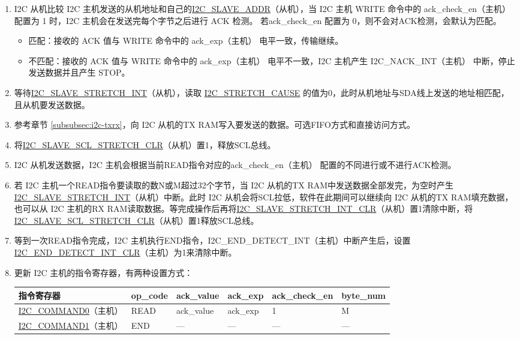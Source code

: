 \documentclass[main\_\_CN.tex]{subfiles}
\begin{document}
\begin{enumerate}
\item I2C 从机比较 I2C 主机发送的从机地址和自己的\hyperref[fielddesc:I2CSLAVEADDR]{I2C\_SLAVE\_ADDR}（从机），当 I2C 主机 WRITE 命令中的 ack\_check\_en（主机） 配置为 1 时，I2C 主机会在发送完每个字节之后进行 ACK 检测。 若ack\_check\_en 配置为 0，则不会对ACK检测，会默认为匹配。
\begin{itemize}
\item 匹配：接收的 ACK 值与 WRITE 命令中的 ack\_exp（主机） 电平一致，传输继续。
\item 不匹配：接收的 ACK 值与 WRITE 命令中的 ack\_exp（主机） 电平不一致，I2C 主机产生 I2C\_NACK\_INT（主机） 中断，停止发送数据并且产生 STOP。
\end{itemize}

\item 等待\hyperref[int:i2c-slave-stretch]{I2C\_SLAVE\_STRETCH\_INT}（从机），读取 \hyperref[fielddesc:I2CSTRETCHCAUSE]{I2C\_STRETCH\_CAUSE} 的值为0，此时从机地址与SDA线上发送的地址相匹配，且从机要发送数据。

\item 参考章节 \ref{subsubsec:i2c-txrx}，向 I2C 从机的TX RAM写入要发送的数据。可选FIFO方式和直接访问方式。
\item 将\hyperref[fielddesc:I2CSLAVESCLSTRETCHCLR]{I2C\_SLAVE\_SCL\_STRETCH\_CLR}（从机）置1，释放SCL总线。

\item I2C 从机发送数据，I2C 主机会根据当前READ指令对应的ack\_check\_en（主机） 配置的不同进行或不进行ACK检测。
\item 若 I2C 主机一个READ指令要读取的数N或M超过32个字节，当 I2C 从机的TX RAM中发送数据全部发完，为空时产生\hyperref[int:i2c-slave-stretch]{I2C\_SLAVE\_STRETCH\_INT}（从机）中断。此时 I2C 从机会将SCL拉低，软件在此期间可以继续向 I2C 从机的TX RAM填充数据，也可以从 I2C 主机的RX RAM读取数据。等完成操作后再将\hyperref[fielddesc:I2CSLAVESTRETCHINTCLR]{I2C\_SLAVE\_STRETCH\_INT\_CLR}（从机）置1清除中断，将 \hyperref[fielddesc:I2CSLAVESCLSTRETCHCLR]{I2C\_SLAVE\_SCL\_STRETCH\_CLR}（从机）置1释放SCL总线。

\item 等到一次READ指令完成，I2C 主机执行END指令，I2C\_END\_DETECT\_INT（主机）中断产生后，设置 \hyperref[fielddesc:I2CENDDETECTINTCLR]{I2C\_END\_DETECT\_INT\_CLR}（主机）为1来清除中断。

\clearpage
\item 更新 I2C 主机的指令寄存器，有两种设置方式：

\begin{longtable}{ | p{4cm} | p{2cm} | p{2cm} | p{2cm} |p{2cm} | p{2cm} |}
\hline\rowcolor{lightgray}
指令寄存器& op\_code & ack\_value&ack\_exp&ack\_check\_en&byte\_num  \\ \hline
\hyperref[fielddesc:I2CCOMMAND0]{I2C\_COMMAND0}（主机）& READ& ack\_value&ack\_exp&1&M  \\ \hline
\hyperref[fielddesc:I2CCOMMAND1]{I2C\_COMMAND1}（主机）& END& ---&---&---&---  \\ \hline
\end{longtable}


\end{enumerate}
\end{document}
